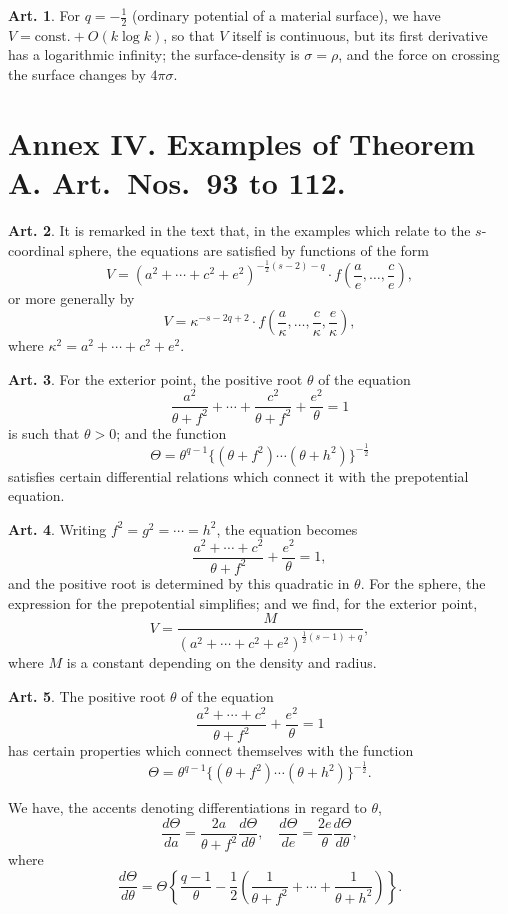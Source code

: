 \documentclass[12pt,a4paper]{article}
\theoremstyle{definition}
\newtheorem{art}{Art.}[section]
\begin{document}
\begin{art}\label{art:80}
For $q = -\tfrac{1}{2}$ (ordinary potential of a material surface), we have $V = \text{const.} + O(k\log k)$, so that $V$ itself is continuous, but its first derivative has a logarithmic infinity; the surface-density is $\sigma = \rho$, and the force on crossing the surface changes by $4\pi\sigma$.
\end{art}

\newpage
\section*{Annex IV. Examples of Theorem A. Art.\ Nos.\ 93 to 112.}

\begin{art}\label{art:93}
It is remarked in the text that, in the examples which relate to the $s$-coordinal sphere, the equations are satisfied by functions of the form
\[
V = (a^2 + \cdots + c^2 + e^2)^{-\frac{1}{2}(s-2)-q} \cdot f\left(\frac{a}{e}, \ldots, \frac{c}{e}\right),
\]
or more generally by
\[
V = \kappa^{-s-2q+2} \cdot f\left(\frac{a}{\kappa}, \ldots, \frac{c}{\kappa}, \frac{e}{\kappa}\right),
\]
where $\kappa^2 = a^2 + \cdots + c^2 + e^2$.
\end{art}

\begin{art}\label{art:94}
For the exterior point, the positive root $\theta$ of the equation
\[
\frac{a^2}{\theta + f^2} + \cdots + \frac{c^2}{\theta + f^2} + \frac{e^2}{\theta} = 1
\]
is such that $\theta > 0$; and the function
\[
\Theta = \theta^{q-1} \{(\theta + f^2) \cdots (\theta + h^2)\}^{-\frac{1}{2}}
\]
satisfies certain differential relations which connect it with the prepotential equation.
\end{art}

\begin{art}\label{art:95}
Writing $f^2 = g^2 = \cdots = h^2$, the equation becomes
\[
\frac{a^2 + \cdots + c^2}{\theta + f^2} + \frac{e^2}{\theta} = 1,
\]
and the positive root is determined by this quadratic in $\theta$. For the sphere, the expression for the prepotential simplifies; and we find, for the exterior point,
\[
V = \frac{M}{(a^2 + \cdots + c^2 + e^2)^{\frac{1}{2}(s-1)+q}},
\]
where $M$ is a constant depending on the density and radius.
\end{art}

\begin{art}\label{art:96}
The positive root $\theta$ of the equation
\[
\frac{a^2 + \cdots + c^2}{\theta + f^2} + \frac{e^2}{\theta} = 1
\]
has certain properties which connect themselves with the function
\[
\Theta = \theta^{q-1} \{(\theta + f^2) \cdots (\theta + h^2)\}^{-\frac{1}{2}}.
\]

We have, the accents denoting differentiations in regard to $\theta$,
\[
\frac{d\Theta}{da} = \frac{2a}{\theta + f^2} \frac{d\Theta}{d\theta}, \quad \frac{d\Theta}{de} = \frac{2e}{\theta} \frac{d\Theta}{d\theta},
\]
where
\[
\frac{d\Theta}{d\theta} = \Theta \left\{\frac{q-1}{\theta} - \frac{1}{2}\left(\frac{1}{\theta + f^2} + \cdots + \frac{1}{\theta + h^2}\right)\right\}.
\]
\end{art}
\end{document}
